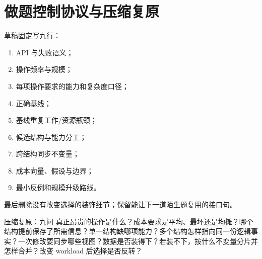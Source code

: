 \documentclass[UTF8,fontset=none,11pt,a4paper]{ctexart}
\begin{document}
\section{做题控制协议与压缩复原}
草稿固定写九行：
\begin{enumerate}
  \item API 与失败语义；
  \item 操作频率与规模；
  \item 每项操作要求的能力和复杂度口径；
  \item 正确基线；
  \item 基线重复工作/资源瓶颈；
  \item 候选结构与能力分工；
  \item 跨结构同步不变量；
  \item 成本向量、假设与边界；
  \item 最小反例和规模升级路线。
\end{enumerate}
最后删除没有改变选择的装饰细节；保留能让下一道陌生题复用的接口句。

\begin{corebox}{压缩复原：九问}
真正昂贵的操作是什么？成本要求是平均、最坏还是均摊？哪个结构提前保存了所需信息？单一结构缺哪项能力？多个结构怎样指向同一份逻辑事实？一次修改要同步哪些视图？数据是否装得下？若装不下，按什么不变量分片并怎样合并？改变 workload 后选择是否反转？
\end{corebox}
\end{document}
